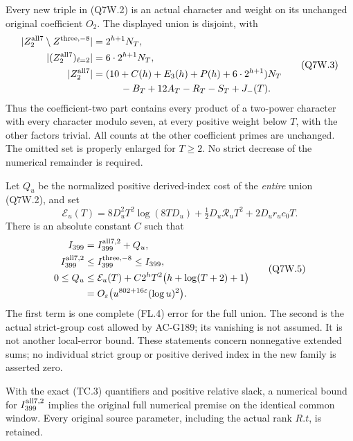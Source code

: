 \begin{theorem}
\label{AC-G190-window}
Every new triple in (Q7W.2) is an actual character and weight
on its unchanged original coefficient $O_2$.
The displayed union is disjoint, with
\[
 \begin{aligned}
 |Z^{\rm all7}_2\setminus Z^{\rm three,-8}|
       &=2^{h+1}N_T,\\
 |(Z^{\rm all7}_2)_{\ell=2}|&=6\cdot2^{h+1}N_T,\\
 |Z^{\rm all7}_2|
       &=(10+C(h)+E_3(h)+P(h)+6\cdot2^{h+1})N_T\\
       &\hspace{1cm}-B_T+12A_T-R_T-S_T+J_-(T).
 \end{aligned}\tag{Q7W.3}
\]
Thus the coefficient-two part contains every product of a
two-power character with every character modulo seven, at every
positive weight below $T$, with the other factors trivial.
All counts at the other coefficient primes are unchanged.
The omitted set is properly enlarged for $T\geq2$.
No strict decrease of the numerical remainder is required.

Let $Q_u$ be the normalized positive derived-index cost of the
\emph{entire} union (Q7W.2), and set
\[
 \mathcal E_u(T)=8D_u^2T^2\log(8TD_u)
        +\tfrac12D_u\mathcal R_uT^2+2D_ur_uc_0T.
 \tag{Q7W.4}
\]
There is an absolute constant $C$ such that
\[
 \begin{aligned}
 I_{399}&=I_{399}^{\rm all7,2}+Q_u,\\
 I_{399}^{\rm all7,2}&\leq I_{399}^{\rm three,-8}\leq I_{399},\\
 0\leq Q_u&\leq\mathcal E_u(T)
              +C2^hT^2\bigl(h+\log(T+2)+1\bigr)\\
 &=O_\varepsilon\bigl(u^{802+16\varepsilon}(\log u)^2\bigr).
 \end{aligned}\tag{Q7W.5}
\]
The first term is one complete (FL.4) error for the full union.
The second is the actual strict-group cost allowed by AC-G189;
its vanishing is not assumed.  It is not another local-error bound.
These statements concern nonnegative extended sums; no individual
strict group or positive derived index in the new family is
asserted zero.

With the exact (TC.3) quantifiers and positive relative slack,
a numerical bound for $I_{399}^{\rm all7,2}$ implies the original
full numerical premise on the identical common window.
Every original source parameter, including the actual rank $R.t$,
is retained.
\end{theorem}

